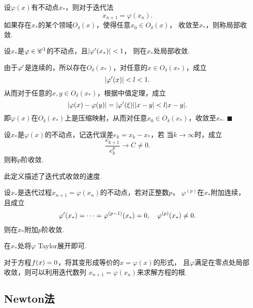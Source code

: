   \begin{defi}[局部收敛]
    设$\varphi(x)$有不动点$x_*$，则对于迭代法
    \begin{equation}
      \label{equ: 迭代法}
      x_{n+1}=\varphi(x_n).
    \end{equation}
    如果存在$x_*$的某个领域$O_\delta(x)$，使得任意$x_0\in O_\delta(x)$，
    收敛至$x_*$，则称局部收敛.
  \end{defi}

  \begin{thm}[局部收敛的条件]
    设$x_*$是$\varphi\in\mathscr{C}^1$的不动点，且$|\varphi^\prime(x_*)|<1$，
    则在$x_*$处局部收敛.
  \end{thm}
  \proof
    由于$\varphi^\prime$是连续的，所以存在$O_\delta(x_*)$，对任意的$x\in
    O_\delta(x_*)$，成立
    \[
      |\varphi^\prime(x)| < l < 1.
    \]
    从而对于任意的$x,y\in O_\delta(x_*)$，根据中值定理，成立
    \[
      |\varphi(x) - \varphi(y)| = |\varphi^\prime(\xi)||x-y| < l|x-y|.
    \]
    即$\varphi(x)$在$O_\delta(x_*)$上是压缩映射，从而对任意$x_0\in
    O_\delta(x_*)$，收敛至$x_*$. $\blacksquare$

  \begin{defi}[$p$阶收敛]
    设$x_*$是$\varphi(x)$的不动点，记迭代误差$e_k=x_k-x_*$，若
    当$k\to\infty$时，成立
    \[
      \frac{e_{k+1}}{e_k^p} \to C \ne 0.
    \]
    则称$p$阶收敛.
  \end{defi}
  \remark
    此定义描述了迭代式收敛的速度.

  \begin{thm}[$p$阶收敛条件]
    设$x_*$是迭代过程$x_{n+1}=\varphi(x_n)$的不动点，若对正整数$p$，
    $\varphi^{(p)}$在$x_*$附加连续，且成立
    \[\begin{split}
      \varphi^\prime(x_*) = \cdots = \varphi^{(p-1)}(x_*) = 0,\quad
      \varphi^{(p)}(x_*) \ne 0.
    \end{split}\]
    则在$x_*$附加$p$阶收敛.
  \end{thm}
  \proof
    在$x_*$处将$\varphi$ Taylor展开即可.

  \begin{alg}[不动点法]
    对于方程$\mathnormal{f}(x) = 0$，将其变形成等价的$x=\varphi(x)$的形式，
    且$\varphi$满足在零点处局部收敛，则可以利用迭代数列
    $x_{n+1} = \varphi(x_n)$来求解方程的根.
  \end{alg}

\subsection{Newton法}
  


